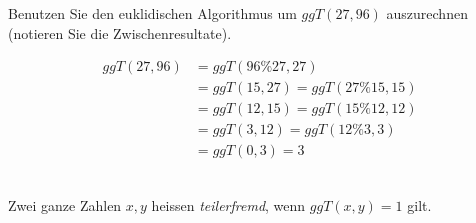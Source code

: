 \begin{ueb}
	Benutzen Sie den euklidischen Algorithmus um $ggT(27,96)$ auszurechnen (notieren Sie die Zwischenresultate).
\end{ueb}
\begin{lsg}
		{
			\begin{align*}
				ggT(27,96) &= ggT(96 \% 27, 27)\\
				 &= ggT(15, 27) = ggT(27 \%15,15)\\
				 &=ggT(12,15)=ggT(15 \%12,12)\\
				 &=ggT(3,12)=ggT(12\%3,3)\\
				 &=ggT(0,3)=3
			\end{align*}
		}
		{~
			\answerspace{6cm}
		}
\end{lsg}
\begin{df}
 Zwei ganze Zahlen $x,y$ heissen \textit{teilerfremd}, wenn $ggT(x,y)=1$ gilt.
\end{df}


